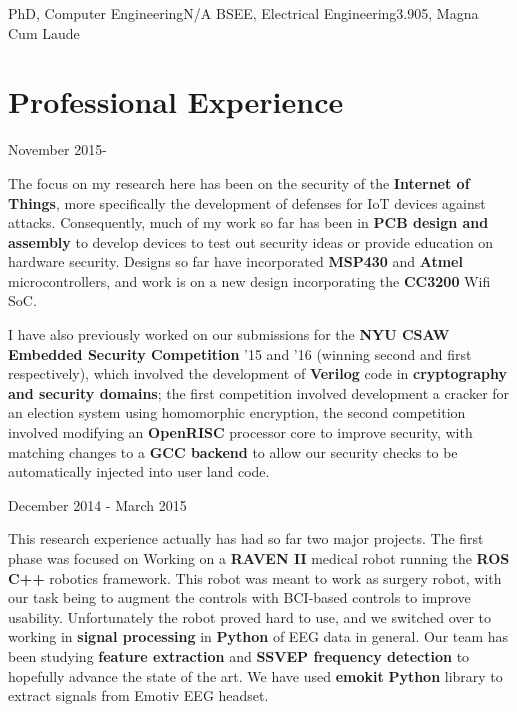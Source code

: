 \documentclass{my_resume}
\begin{document}

    {PhD, Computer Engineering}{N/A}
	{BSEE, Electrical Engineering}{3.905, Magna Cum Laude}

\section{Professional Experience}
    {November 2015-}
\begin{flushleft}
The focus on my research here has been on the security of the \textbf{Internet of Things}, more specifically the development of defenses for IoT devices against attacks.
Consequently, much of my work so far has been in \textbf{PCB design and assembly} to develop devices to test out security ideas or provide education on hardware security. 
Designs so far have incorporated \textbf{MSP430} and \textbf{Atmel} microcontrollers, and work is on a new design incorporating the \textbf{CC3200} Wifi SoC.

I have also previously worked on our submissions for the \textbf{NYU CSAW Embedded Security Competition} '15 and '16 (winning second and first respectively), which involved the development of \textbf{Verilog} code in
\textbf{cryptography and security domains}; the first competition involved development a cracker for an election system using homomorphic encryption, the second competition involved modifying an \textbf{OpenRISC}
processor core to improve security, with matching changes to a \textbf{GCC backend} to allow our security checks to be automatically injected into user land code.
\end{flushleft}
	{December 2014 - March 2015}
\begin{flushleft}
This research experience actually has had so far two major projects. The first
phase was focused on Working on a \textbf{RAVEN II} medical robot running the
\textbf{ROS C++} robotics framework. This robot was meant to work as surgery
robot, with our task being to augment the controls with BCI-based controls to
improve usability. Unfortunately the robot proved hard to use, and we switched
over to working in \textbf{signal processing} in \textbf{Python} of EEG data in
general. Our team has been studying \textbf{feature extraction} and
\textbf{SSVEP frequency detection} to hopefully advance the state of the art.
We have used \textbf{emokit} \textbf{Python} library to extract signals from
Emotiv EEG headset.
\end{flushleft}
\end{document}
